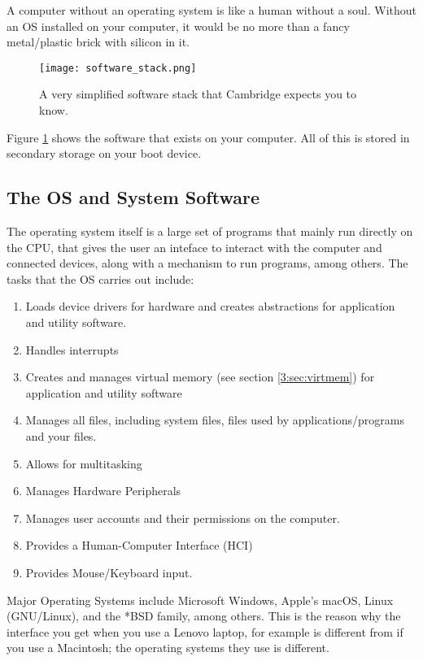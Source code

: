 \documentclass[../main.tex]{subfiles}
\begin{document}
A computer without an operating system is like a human without a soul. Without an OS installed on your computer, it would be no more than a fancy metal/plastic brick with silicon in it. 

\begin{figure}[H]
    \centering
    \texttt{[image: software\_stack.png]}
    \caption{A very simplified software stack that Cambridge expects you to know.}
    \label{fig:software_stack}
\end{figure}

Figure \ref{fig:software_stack} shows the software that exists on your computer. All of this is stored in secondary storage on your boot device.

\subsection{The OS and System Software}

The operating system itself is a large set of programs that mainly run directly on the CPU, that gives the user an inteface to interact with the computer and connected devices, along with a mechanism to run programs, among others. The tasks that the OS carries out include:

\begin{enumerate}
    \item Loads device drivers for hardware and creates abstractions for application and utility software.
    \item Handles interrupts
    \item Creates and manages virtual memory (see section \ref{3:sec:virtmem}) for application and utility software
    \item Manages all files, including system files, files used by applications/programs and your files.
    \item Allows for multitasking
    \item Manages Hardware Peripherals
    \item Manages user accounts and their permissions on the computer.
    \item Provides a Human-Computer Interface (HCI)
    \item Provides Mouse/Keyboard input.
\end{enumerate}

Major Operating Systems include Microsoft Windows, Apple's macOS, Linux (GNU/Linux), and the *BSD family, among others. This is the reason why the interface you get when you use a Lenovo laptop, for example is different from if you use a Macintosh; the operating systems they use is different.
\end{document}
